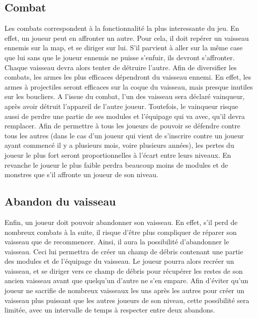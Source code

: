 \documentclass[a4paper,11pt]{report}
\begin{document}
    \subsection{Combat}
      Les combats correspondent à la fonctionnalité la plus interessante du jeu. En effet, un joueur peut en affronter un autre.
      Pour cela, il doit repérer un vaisseau ennemis sur la map, et se diriger sur lui. 
      S'il parvient à aller sur la même case que lui sans que le joueur ennemis ne puisse s'enfuir, ils devront s'affronter.
      Chaque vaisseau devra alors tenter de détruire l'autre. Afin de diversifier les combats, les armes les plus efficaces dépendront du vaisseau ennemi.
      En effet, les armes à projectiles seront efficaces sur la coque du vaisseau, mais presque inutiles sur les boucliers.
      A l'issue du combat, l'un des vaisseau sera déclaré vainqueur, après avoir détruit l'appareil de l'autre joueur. 
      Toutefois, le vainqueur risque aussi de perdre une partie de ses modules et l'équipage qui va avec, qu'il devra remplacer.
      Afin de permettre à tous les joueurs de pouvoir se défendre contre tous les autres (dans le cas d'un joueur qui vient de s'inscrire contre un joueur ayant commencé il y a plusieurs mois, voire plusieurs années), les pertes du joueur le plus fort seront proportionnelles à l'écart entre leurs niveaux.
      En revanche le joueur le plus faible perdra beaucoup moins de modules et de monstres que s'il affronte un joueur de son niveau.
      
    \subsection{Abandon du vaisseau}
      Enfin, un joueur doit pouvoir abandonner son vaisseau. 
      En effet, s'il perd de nombreux combats à la suite, il risque d'être plus compliquer de réparer son vaisseau que de recommencer.
      Ainsi, il aura la possibilité d'abandonner le vaisseau. Ceci lui permettra de créer un champ de débris contenant une partie des modules et de l'équipage du vaisseau.
      Le joueur pourra alors recréer un vaisseau, et se diriger vers ce champ de débris pour récupérer les restes de son ancien vaisseau avant que quelqu'un d'autre ne s'en empare.
      Afin d'éviter qu'un joueur ne sacrifie de nombreux vaisseaux les uns après les autres pour créer un vaisseau plus puissant que les autres joueurs de son niveau, cette possibilité sera limitée, avec un intervalle de temps à respecter entre deux abandons.
\end{document}
